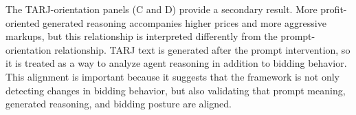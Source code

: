 The TARJ-orientation panels (C and D) provide a secondary result. More profit-oriented generated reasoning accompanies higher prices and more aggressive markups, but this relationship is interpreted differently from the prompt-orientation relationship. TARJ text is generated after the prompt intervention, so it is treated as a way to analyze agent reasoning in addition to bidding behavior. This alignment is important because it suggests that the framework is not only detecting changes in bidding behavior, but also validating that prompt meaning, generated reasoning, and bidding posture are aligned.
